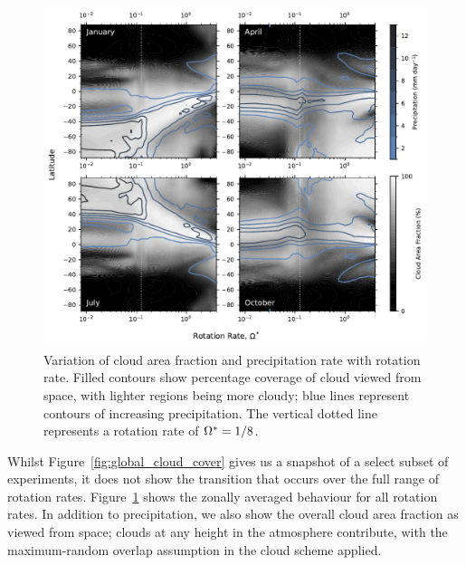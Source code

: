 \begin{figure}[tb]
    \centering
    \includegraphics[width=1.0\textwidth]{plots/2-cloud_rotation_seasonal_alt.pdf}
    \caption{Variation of cloud area fraction and precipitation rate with rotation rate. Filled contours show percentage coverage of cloud viewed from space, with lighter regions being more cloudy; blue lines represent contours of increasing precipitation. The vertical dotted line represents a rotation rate of $\Omega^*=1/8$.}
    \label{fig:cloud_rotation_seasonal}
\end{figure}

Whilst Figure~\ref{fig:global_cloud_cover} gives us a snapshot of a select subset of experiments, it does not show the transition that occurs over the full range of rotation rates. Figure~\ref{fig:cloud_rotation_seasonal} shows the zonally averaged behaviour for all rotation rates. In addition to precipitation, we also show the overall cloud area fraction as viewed from space; clouds at any height in the atmosphere contribute, with the maximum-random overlap assumption in the cloud scheme applied.

